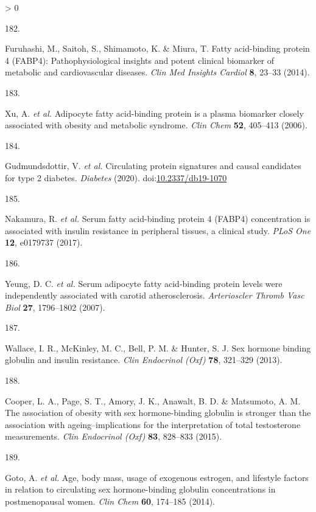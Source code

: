 \documentclass[11pt,twoside]{bristolthesis}
\newlength{\cslhangindent}
\newlength{\csllabelwidth}
\newenvironment{CSLReferences}[2] %
 {%
  \setlength{\parindent}{0pt}
  \ifodd #1 \everypar{\setlength{\hangindent}{\cslhangindent}}\ignorespaces\fi
  \ifnum #2 > 0
  \setlength{\parskip}{#2\baselineskip}
  \fi
 }%
 {}
\newcommand{\CSLLeftMargin}[1]{\parbox[t]{\csllabelwidth}{#1}}
\newcommand{\CSLRightInline}[1]{\parbox[t]{\linewidth - \csllabelwidth}{#1}\break}
\begin{document}
\begin{CSLReferences}{0}{0}
\leavevmode\hypertarget{ref-Furuhashi2014}{}%
\CSLLeftMargin{182. }
\CSLRightInline{Furuhashi, M., Saitoh, S., Shimamoto, K. \& Miura, T. Fatty acid-binding protein 4 (FABP4): Pathophysiological insights and potent clinical biomarker of metabolic and cardiovascular diseases. \emph{Clin Med Insights Cardiol} \textbf{8}, 23--33 (2014).}

\leavevmode\hypertarget{ref-Xu2006}{}%
\CSLLeftMargin{183. }
\CSLRightInline{Xu, A. \emph{et al.} Adipocyte fatty acid-binding protein is a plasma biomarker closely associated with obesity and metabolic syndrome. \emph{Clin Chem} \textbf{52}, 405--413 (2006).}

\leavevmode\hypertarget{ref-Gudmundsdottir2020}{}%
\CSLLeftMargin{184. }
\CSLRightInline{Gudmundsdottir, V. \emph{et al.} Circulating protein signatures and causal candidates for type 2 diabetes. \emph{Diabetes} (2020). doi:\href{https://doi.org/10.2337/db19-1070}{10.2337/db19-1070}}

\leavevmode\hypertarget{ref-Nakamura2017}{}%
\CSLLeftMargin{185. }
\CSLRightInline{Nakamura, R. \emph{et al.} Serum fatty acid-binding protein 4 (FABP4) concentration is associated with insulin resistance in peripheral tissues, a clinical study. \emph{PLoS One} \textbf{12}, e0179737 (2017).}

\leavevmode\hypertarget{ref-Yeung2007}{}%
\CSLLeftMargin{186. }
\CSLRightInline{Yeung, D. C. \emph{et al.} Serum adipocyte fatty acid-binding protein levels were independently associated with carotid atherosclerosis. \emph{Arterioscler Thromb Vasc Biol} \textbf{27}, 1796--1802 (2007).}

\leavevmode\hypertarget{ref-Wallace2013}{}%
\CSLLeftMargin{187. }
\CSLRightInline{Wallace, I. R., McKinley, M. C., Bell, P. M. \& Hunter, S. J. Sex hormone binding globulin and insulin resistance. \emph{Clin Endocrinol (Oxf)} \textbf{78}, 321--329 (2013).}

\leavevmode\hypertarget{ref-Cooper2015}{}%
\CSLLeftMargin{188. }
\CSLRightInline{Cooper, L. A., Page, S. T., Amory, J. K., Anawalt, B. D. \& Matsumoto, A. M. The association of obesity with sex hormone-binding globulin is stronger than the association with ageing--implications for the interpretation of total testosterone measurements. \emph{Clin Endocrinol (Oxf)} \textbf{83}, 828--833 (2015).}

\leavevmode\hypertarget{ref-Goto2014}{}%
\CSLLeftMargin{189. }
\CSLRightInline{Goto, A. \emph{et al.} Age, body mass, usage of exogenous estrogen, and lifestyle factors in relation to circulating sex hormone-binding globulin concentrations in postmenopausal women. \emph{Clin Chem} \textbf{60}, 174--185 (2014).}


\end{CSLReferences}
\end{document}
